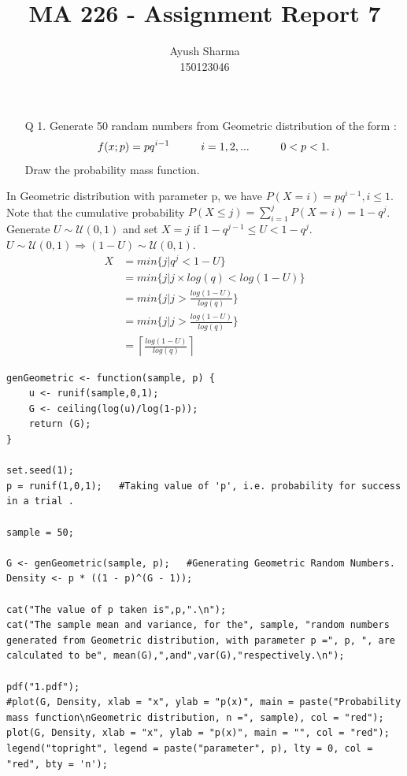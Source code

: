 \documentclass[11pt]{article}
\title{MA 226 - Assignment Report 7}
\author{Ayush Sharma\\150123046}
\begin{document}
\titlepage
\newpage
\begin{enumerate}
\item[Q 1.] Generate 50 randam numbers from Geometric distribution of the form :
$$f(x;p) = pq^{i-1} \hspace{10mm} i = 1,2,... \hspace{10mm} 0 < p < 1.$$
Draw the probability mass function.
\end{enumerate}

In Geometric distribution with parameter p, we have $P(X=i) = pq^{i-1} , i \leq 1$.\\
Note that the cumulative probability $P(X \leq j) = \sum_{i=1}^{j} P(X=i) = 1 - q^{j}$.\\
Generate $U \sim \mathcal{U}(0,1)$ and set $X = j$ if $1 - q^{j-1} \leq U < 1 - q^{j}$.\\
$U \sim \mathcal{U}(0,1) \Rightarrow (1 - U) \sim \mathcal{U}(0,1)$.\\
\begin{equation}
\begin{split}
X	& = min\{j | q^{j} < 1 - U\}\\
	& = min\{j | j \times log(q) < log(1 - U)\}\\
	& = min\{j | j > \frac{log(1 - U)}{log(q)}\}\\
	& = min\{j | j > \frac{log(1 - U)}{log(q)}\}\\
	& = \left \lceil {\frac{log(1 - U)}{log(q)}} \right \rceil
\end{split}
\end{equation}

\begin{lstlisting}
genGeometric <- function(sample, p) {
	u <- runif(sample,0,1);
	G <- ceiling(log(u)/log(1-p));
	return (G);
}

set.seed(1);
p = runif(1,0,1);	#Taking value of 'p', i.e. probability for success in a trial .

sample = 50;

G <- genGeometric(sample, p);	#Generating Geometric Random Numbers.
Density <- p * ((1 - p)^(G - 1));

cat("The value of p taken is",p,".\n");
cat("The sample mean and variance, for the", sample, "random numbers generated from Geometric distribution, with parameter p =", p, ", are calculated to be", mean(G),",and",var(G),"respectively.\n");

pdf("1.pdf");
#plot(G, Density, xlab = "x", ylab = "p(x)", main = paste("Probability mass function\nGeometric distribution, n =", sample), col = "red");
plot(G, Density, xlab = "x", ylab = "p(x)", main = "", col = "red");
legend("topright", legend = paste("parameter", p), lty = 0, col = "red", bty = 'n');
\end{lstlisting}
\end{document}
